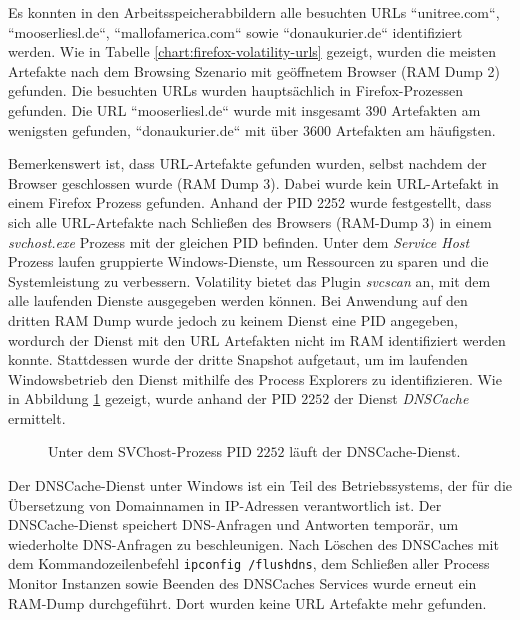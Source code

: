 Es konnten in den Arbeitsspeicherabbildern alle besuchten URLs ``unitree.com``, ``mooserliesl.de``, ``mallofamerica.com`` sowie ``donaukurier.de`` identifiziert werden.
Wie in Tabelle \ref{chart:firefox-volatility-urls} gezeigt, wurden die meisten Artefakte nach dem Browsing Szenario mit geöffnetem Browser (RAM Dump 2) gefunden. Die besuchten URLs wurden hauptsächlich in Firefox-Prozessen gefunden. Die URL ``mooserliesl.de`` wurde mit insgesamt 390 Artefakten am wenigsten gefunden, ``donaukurier.de`` mit über 3600 Artefakten am häufigsten.

Bemerkenswert ist, dass URL-Artefakte gefunden wurden, selbst nachdem der Browser geschlossen wurde (RAM Dump 3). Dabei wurde kein URL-Artefakt in einem Firefox Prozess gefunden.
Anhand der PID 2252 wurde festgestellt, dass sich alle URL-Artefakte nach Schließen des Browsers (RAM-Dump 3) in einem \textit{svchost.exe} Prozess mit der gleichen PID befinden. Unter dem \textit{Service Host} Prozess laufen gruppierte Windows-Dienste, um Ressourcen zu sparen und die Systemleistung zu verbessern.
Volatility bietet das Plugin \textit{svcscan} an, mit dem alle laufenden Dienste ausgegeben werden können.
Bei Anwendung auf den dritten RAM Dump wurde jedoch zu keinem Dienst eine PID angegeben, wordurch der Dienst mit den URL Artefakten nicht im RAM identifiziert werden konnte. \cite{Nicholasswhite.05.06.2023}
Stattdessen wurde der dritte Snapshot aufgetaut, um im laufenden Windowsbetrieb den Dienst mithilfe des Process Explorers zu identifizieren.
Wie in Abbildung \ref{chart:svchost-dnscache} gezeigt, wurde anhand der PID $2252$ der Dienst \textit{DNSCache} ermittelt.
\begin{figure}[h!]
	\centerline{}
	\caption{Unter dem SVChost-Prozess PID $2252$ läuft der DNSCache-Dienst.}
	\label{chart:svchost-dnscache}  
\end{figure}
Der DNSCache-Dienst unter Windows ist ein Teil des Betriebssystems, der für die Übersetzung von Domainnamen in IP-Adressen verantwortlich ist. Der DNSCache-Dienst speichert DNS-Anfragen und Antworten temporär, um wiederholte DNS-Anfragen zu beschleunigen. \cite{MicrosoftLearn.05.06.2023}
Nach Löschen des DNSCaches mit dem Kommandozeilenbefehl \texttt{ipconfig /flushdns}, dem Schließen aller Process Monitor Instanzen sowie Beenden des DNSCaches Services wurde erneut ein RAM-Dump durchgeführt. Dort wurden keine URL Artefakte mehr gefunden.

